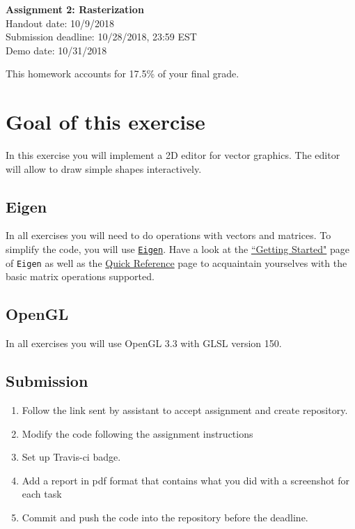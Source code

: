\documentclass[11pt]{article}
\begin{document}
\hspace{50pt}

\begin{center}

{\Huge \textbf{Assignment 2: Rasterization}}\\
\vspace{10pt}
Handout date: 10/9/2018\\
Submission deadline: 10/28/2018,  23:59 EST\\
Demo date: 10/31/2018
\end{center}

\noindent This homework accounts for 17.5\% of your final grade. 

\section*{Goal of this exercise}
In this exercise you will implement a 2D editor for vector graphics. The editor will allow to draw simple shapes interactively.

\subsection*{Eigen}
In all exercises you will need to do operations with vectors and matrices. To simplify the code, you will use \href{http://eigen.tuxfamily.org/}{\texttt{Eigen}}. 
Have a look at the \href{http://eigen.tuxfamily.org/dox/GettingStarted.html}{``Getting Started"} page of \texttt{Eigen} as well as the \href{http://eigen.tuxfamily.org/dox/group__QuickRefPage.html}{Quick Reference} page to acquaintain yourselves with the basic matrix operations supported. 

\subsection*{OpenGL}
In all exercises you will use OpenGL 3.3 with GLSL version 150.

\subsection*{Submission}

\begin{enumerate}
\item Follow the link sent by assistant to accept assignment and create repository.
\item Modify the code following the assignment instructions
\item Set up Travis-ci badge.
\item Add a report in pdf format that contains what you did with a screenshot for each task
\item Commit and push the code into the repository before the deadline.
\end{enumerate}
\end{document}
